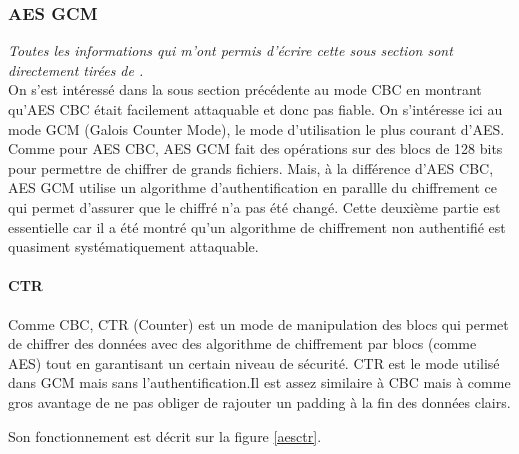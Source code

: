 \documentclass[a4paper, 12pt]{article}
\begin{document}
\subsubsection{AES GCM}
\noindent\emph{Toutes les informations qui m'ont permis d'écrire cette sous section sont directement tirées de \cite{courscourt}.}\\


On s'est intéressé dans la sous section précédente au mode CBC en montrant qu'AES CBC était facilement attaquable et donc pas fiable. On s'intéresse ici au mode GCM (Galois Counter Mode), le mode d'utilisation le plus courant d'AES. Comme pour AES CBC, AES GCM fait des opérations sur des blocs de 128 bits pour permettre de chiffrer de grands fichiers. Mais, à la différence d'AES CBC, AES GCM utilise un algorithme d'authentification en parallle du chiffrement ce qui permet d'assurer que le chiffré n'a pas été changé. Cette deuxième partie est essentielle car il a été montré qu'un algorithme de chiffrement non authentifié est quasiment systématiquement attaquable.

\paragraph{CTR} \label{CTR}
Comme CBC, CTR (Counter) est un mode de manipulation des blocs qui permet de chiffrer des données avec des algorithme de chiffrement par blocs (comme AES) tout en garantisant un certain niveau de sécurité. CTR est le mode utilisé dans GCM mais sans l'authentification.Il est assez similaire à CBC mais à comme gros avantage de ne pas obliger de rajouter un padding à la fin des données clairs.

Son fonctionnement est décrit sur la figure \ref{aesctr}. 
\end{document}
